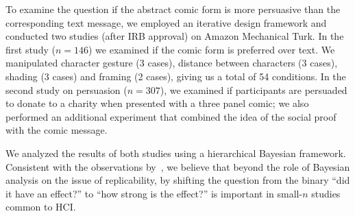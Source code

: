 



To examine the question if the abstract comic form is more persuasive than the corresponding text message, we employed an iterative design framework and conducted two studies (after IRB approval) on Amazon Mechanical Turk. In the first study ($n=146$) we examined if the comic form is preferred over text. We manipulated character gesture (3 cases), distance between characters (3 cases), shading (3 cases) and framing (2 cases), giving us a total of 54 conditions. In the second study on persuasion ($n=307$), we examined if participants are persuaded to donate to a charity when presented with a three panel comic; we also performed an additional experiment that combined the idea of the social proof with the comic message.

We analyzed the results of both studies using a hierarchical Bayesian framework. Consistent with the observations by~\textcite{Kay2016}, we believe that beyond the role of Bayesian analysis on the issue of replicability, by shifting the question from the binary ``did it have an effect?'' to ``how strong is the effect?'' is important in small-$n$ studies common to HCI.

